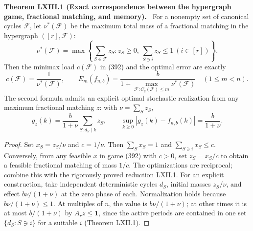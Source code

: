 \documentclass[11pt,a4paper,oneside]{book}
\newcommand{\one}{\mathbf 1}\newcommand{\ii}{\mathrm i}\newcommand{\dd}{\mathrm d}
\newcommand{\statement}[3]{\par\medskip\noindent\textbf{#1 #2 (#3).}\ }
\begin{document}
\statement{Theorem}{LXIII.1}{Exact correspondence between the hypergraph game, fractional matching, and memory}
For a nonempty set of canonical cycles $\mathcal F$, let $\nu^*(\mathcal F)$ be the maximum total mass of a fractional matching in the hypergraph $([r],\mathcal F)$:
\[
\nu^*(\mathcal F)=\max\left\{\sum_{S\in\mathcal F}z_S:z_S\ge0,\ \sum_{S\ni i}z_S\le1\ (i\in[r])\right\}.
\]
Then the minimax load $c(\mathcal F)$ in (392) and the optimal error are exactly
\begin{equation}
c(\mathcal F)=\frac1{\nu^*(\mathcal F)},\qquad
E_m(f_{n,b})=\frac b{1+\max_{\mathcal F:C_q(\mathcal F)\le m}\nu^*(\mathcal F)}\quad(1\le m<n).\tag{402}
\end{equation}
The second formula admits an explicit optimal stochastic realization from any maximum fractional matching $z$: with $\nu=\sum_Sz_S$,
\begin{equation}
g_z(k)=\frac b{1+\nu}\sum_{S:d_S\mid k}z_S,\qquad
\sup_{k\ge0}|g_z(k)-f_{n,b}(k)|=\frac b{1+\nu}.\tag{403}
\end{equation}
\begin{proof}
Set $x_S=z_S/\nu$ and $c=1/\nu$. Then $\sum_Sx_S=1$ and $\sum_{S\ni i}x_S\le c$. Conversely, from any feasible $x$ in game (392) with $c>0$, set $z_S=x_S/c$ to obtain a feasible fractional matching of mass $1/c$. The optimizations are reciprocal; combine this with the rigorously proved reduction LXII.1. For an explicit construction, take independent deterministic cycles $d_S$, initial masses $z_S/\nu$, and effect $b\nu/(1+\nu)$ at the zero phase of each. Normalization holds because $b\nu/(1+\nu)\le1$. At multiples of $n$, the value is $b\nu/(1+\nu)$; at other times it is at most $b/(1+\nu)$ by $A_rz\le\one$, since the active periods are contained in one set $\{d_S:S\ni i\}$ for a suitable $i$ (Theorem LXII.1).
\end{proof}
\end{document}
